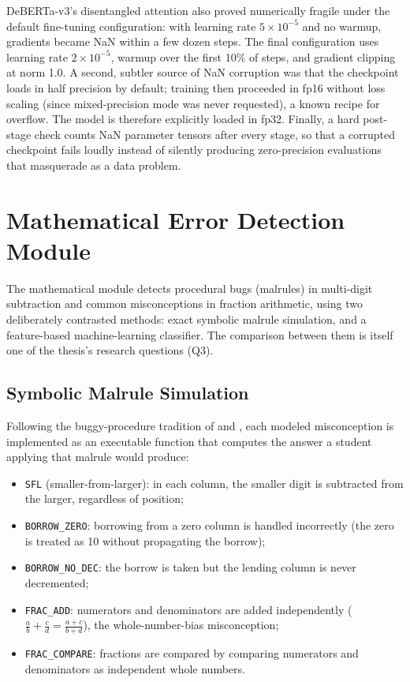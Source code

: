 DeBERTa-v3's disentangled attention also proved numerically fragile under the default fine-tuning configuration: with learning rate $5\times10^{-5}$ and no warmup, gradients became NaN within a few dozen steps. The final configuration uses learning rate $2\times10^{-5}$, warmup over the first 10\% of steps, and gradient clipping at norm 1.0. A second, subtler source of NaN corruption was that the checkpoint loads in half precision by default; training then proceeded in fp16 without loss scaling (since mixed-precision mode was never requested), a known recipe for overflow. The model is therefore explicitly loaded in fp32. Finally, a hard post-stage check counts NaN parameter tensors after every stage, so that a corrupted checkpoint fails loudly instead of silently producing zero-precision evaluations that masquerade as a data problem.

\section{Mathematical Error Detection Module}
\label{sec:impl_math}

The mathematical module detects procedural bugs (malrules) in multi-digit subtraction and common misconceptions in fraction arithmetic, using two deliberately contrasted methods: exact symbolic malrule simulation, and a feature-based machine-learning classifier. The comparison between them is itself one of the thesis's research questions (Q3).

\subsection{Symbolic Malrule Simulation}
\label{sec:impl_math_malrule}

Following the buggy-procedure tradition of \textcite{BrownBurton1978} and \textcite{VanLehn1990}, each modeled misconception is implemented as an executable function that computes the answer a student applying that malrule would produce:

\begin{itemize}
    \item \texttt{SFL} (smaller-from-larger): in each column, the smaller digit is subtracted from the larger, regardless of position;
    \item \texttt{BORROW\_ZERO}: borrowing from a zero column is handled incorrectly (the zero is treated as 10 without propagating the borrow);
    \item \texttt{BORROW\_NO\_DEC}: the borrow is taken but the lending column is never decremented;
    \item \texttt{FRAC\_ADD}: numerators and denominators are added independently ($\frac{a}{b} + \frac{c}{d} = \frac{a+c}{b+d}$), the whole-number-bias misconception;
    \item \texttt{FRAC\_COMPARE}: fractions are compared by comparing numerators and denominators as independent whole numbers.
\end{itemize}

